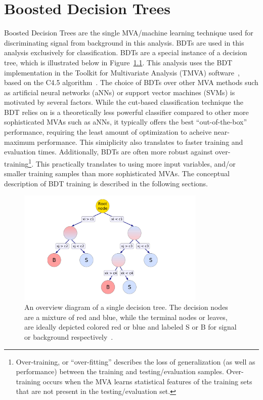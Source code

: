 %
%

\chapter{Boosted Decision Trees}
\label{app:bdts}
Boosted Decision Trees are the single MVA/machine learning technique used for discriminating signal from background
in this analysis. BDTs are used in this analysis exclusively for classification.
BDTs are a special instance of a decision tree, which is illustrated below in Figure~\ref{fig:dec_tree}.
This analysis uses the BDT implementation in the Toolkit for Multivariate Analysis (TMVA) software~\cite{tmva}, based on the
C4.5 algorithm~\cite{C4.5}.
The choice of BDTs over other MVA methods such as artificial neural networks (aNNs) or support vector machines (SVMs) is motivated
by several factors. While the cut-based classification technique the BDT relies on is a theoretically less powerful classifier compared
to other more sophisticated MVAs such as aNNs, it typically offers the best ``out-of-the-box'' performance, requiring the least amount
of optimization to acheive near-maximum performance. This simiplicity also translates to faster training and evaluation times.
Additionally, BDTs are often more robust against over-training\footnote{Over-training, or ``over-fitting'' describes the loss of generalization (as well as performance)
between the training and testing/evaluation samples. Over-training occurs when the MVA learns statistical features of the training sets that are not present in
the testing/evaluation set.}. This practically translates to using more input variables, and/or smaller training samples than more sophisticated MVAs.
The conceptual description of BDT training is described in the following sections. 
 
\begin{figure}[hbtp]
 \begin{center}
   \includegraphics[width=0.8\textwidth]{ap2_figs/decision_tree.pdf}
   \caption[A decision tree diagram.]{An overview diagram of a single decision tree. The decision nodes are a mixture of red and blue,
     while the terminal nodes or leaves, are ideally depicted colored red or blue and labeled S or B for signal or background respectively~\cite{tmva}.}
   \label{fig:dec_tree}
 \end{center}
\end{figure}


